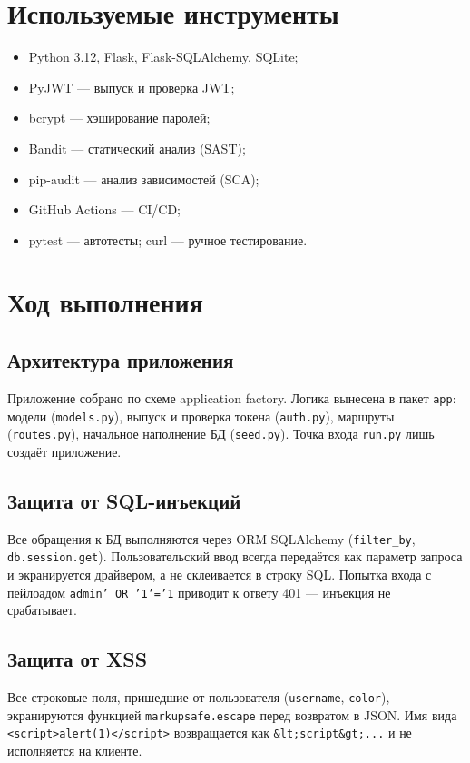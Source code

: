 \documentclass[14pt,a4paper]{extarticle}
\begin{document}
\section{Используемые инструменты}
\begin{itemize}
    \item Python 3.12, Flask, Flask-SQLAlchemy, SQLite;
    \item PyJWT — выпуск и проверка JWT;
    \item bcrypt — хэширование паролей;
    \item Bandit — статический анализ (SAST);
    \item pip-audit — анализ зависимостей (SCA);
    \item GitHub Actions — CI/CD;
    \item pytest — автотесты; curl — ручное тестирование.
\end{itemize}

\section{Ход выполнения}

\subsection{Архитектура приложения}
Приложение собрано по схеме application factory. Логика вынесена в пакет
\texttt{app}: модели (\texttt{models.py}), выпуск и проверка токена
(\texttt{auth.py}), маршруты (\texttt{routes.py}), начальное наполнение БД
(\texttt{seed.py}). Точка входа \texttt{run.py} лишь создаёт приложение.

\subsection{Защита от SQL-инъекций}
Все обращения к БД выполняются через ORM SQLAlchemy
(\texttt{filter\_by}, \texttt{db.session.get}). Пользовательский ввод всегда
передаётся как параметр запроса и экранируется драйвером, а не склеивается в
строку SQL. Попытка входа с пейлоадом \texttt{admin' OR '1'='1} приводит к ответу
401 — инъекция не срабатывает.

\subsection{Защита от XSS}
Все строковые поля, пришедшие от пользователя (\texttt{username}, \texttt{color}),
экранируются функцией \texttt{markupsafe.escape} перед возвратом в JSON. Имя
вида \texttt{<script>alert(1)</script>} возвращается как
\texttt{\&lt;script\&gt;...} и не исполняется на клиенте.
\end{document}
